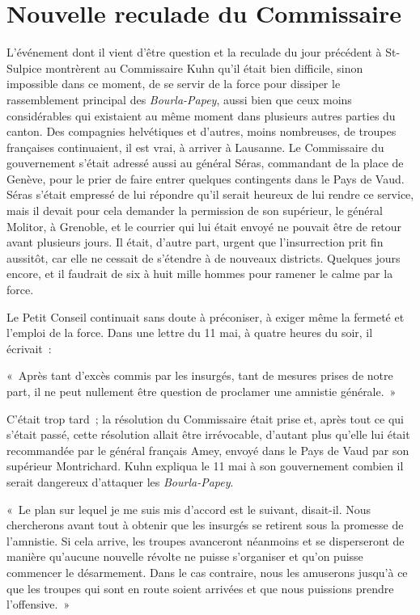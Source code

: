 \documentclass[french,twoside]{book} %
\newenvironment{quoteblock}%
  {\begin{quoting}}
  {\end{quoting}}
\newenvironment{quotebar}{%
    \def\FrameCommand{{\color{rubric!10!}\vrule width 0.5em} \hspace{0.9em}}%
    \def\OuterFrameSep{\itemsep} %
    \MakeFramed {\advance\hsize-\width \FrameRestore}
  }%
  {%
    \endMakeFramed
  }
\renewenvironment{quoteblock}%
  {%
    \savenotes
    \setstretch{0.9}
    \normalfont
    \begin{quotebar}
  }
  {%
    \end{quotebar}
    \spewnotes
  }
\begin{document}
\section[Nouvelle reculade du Commissaire]{Nouvelle reculade du Commissaire}
\noindent L’événement dont il vient d’être question et la reculade du jour précédent à St-Sulpice montrèrent au Commissaire Kuhn qu’il était bien difficile, sinon impossible dans ce moment, de se servir de la force pour dissiper le rassemblement principal des \emph{Bourla-Papey}, aussi bien que ceux moins considérables qui existaient au même moment dans plusieurs autres parties du canton. Des compagnies helvétiques et d’autres, moins nombreuses, de troupes françaises continuaient, il est vrai, à arriver à Lausanne. Le Commissaire du gouvernement s’était adressé aussi au général Séras, commandant de la place de Genève, pour le prier de faire entrer quelques contingents dans le Pays de Vaud. Séras s’était empressé de lui répondre qu’il serait heureux de lui rendre ce service, mais il devait pour cela demander la permission de son supérieur, le général Molitor, à Grenoble, et le courrier qui lui était envoyé ne pouvait être de retour avant plusieurs jours. Il était, d’autre part, urgent que l’insurrection prit fin aussitôt, car elle ne cessait de s’étendre à de nouveaux districts. Quelques jours encore, et il faudrait de six à huit mille hommes pour ramener le calme par la force.\par
Le Petit Conseil continuait sans doute à préconiser, à exiger même la fermeté et l’emploi de la force. Dans une lettre du 11 mai, à quatre heures du soir, il écrivait :\par

\begin{quoteblock}
\noindent « Après tant d’excès commis par les insurgés, tant de mesures prises de notre part, il ne peut nullement être question de proclamer une amnistie générale. »\end{quoteblock}

\noindent C’était trop tard ; la résolution du Commissaire était prise et, après tout ce qui s’était passé, cette résolution allait être irrévocable, d’autant plus qu’elle lui était recommandée par le général français Amey, envoyé dans le Pays de Vaud par son supérieur Montrichard. Kuhn expliqua le 11 mai à son gouvernement combien il serait dangereux d’attaquer les \emph{Bourla-Papey}.\par

\begin{quoteblock}
\noindent « Le plan sur lequel je me suis mis d’accord est le suivant, disait-il. Nous chercherons avant tout à obtenir que les insurgés se retirent sous la promesse de l’amnistie. Si cela arrive, les troupes avanceront néanmoins et se disperseront de manière qu’aucune nouvelle révolte ne puisse s’organiser et qu’on puisse commencer le désarmement. Dans le cas contraire, nous les amuserons jusqu’à ce que les troupes qui sont en route soient arrivées et que nous puissions prendre l’offensive. »\end{quoteblock}
\end{document}
